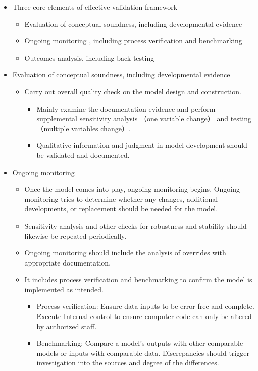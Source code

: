 \begin{itemize}
\item Three core elements of effective validation framework 
    \begin{itemize}
    \item  Evaluation of conceptual soundness, including developmental evidence
    \item  Ongoing monitoring , including process verification and benchmarking
    \item  Outcomes analysis, including back-testing
    
    \end{itemize}
\item  Evaluation of conceptual soundness, including developmental evidence
    \begin{itemize}
    \item Carry out overall quality check on the model design and construction.
        \begin{itemize}
        \item Mainly examine the documentation evidence and perform supplemental sensitivity analysis （one variable change） and testing （multiple variables change）.
        \item Qualitative information and judgment in model development should be validated and documented. 
        \end{itemize}
    \end{itemize}
\item Ongoing monitoring
    \begin{itemize}
    \item Once the model comes into play, ongoing monitoring begins. Ongoing monitoring tries to determine whether any changes, additional developments, or replacement should be needed for the model.
    \item Sensitivity analysis and other checks for robustness and stability should likewise be repeated periodically.
    \item Ongoing monitoring should include the analysis of overrides with appropriate documentation.
    \item It includes process verification and benchmarking to confirm the model is implemented as intended.
        \begin{itemize}
        \item Process verification: Ensure data inputs to be error-free and complete. Execute Internal control to ensure computer code can only be altered by authorized staff.
        \item Benchmarking: Compare a model's outputs with other comparable models or inputs with comparable data. Discrepancies should trigger investigation into the sources and degree of the differences. 
        \end{itemize}   
    \end{itemize}
    

\end{itemize}

